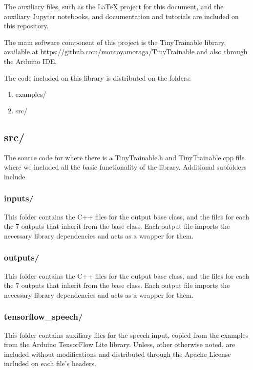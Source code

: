The auxiliary files, such as the LaTeX project for this document, and the auxiliary Jupyter notebooks, and documentation and tutorials are included on this repository.

The main software component of this project is the TinyTrainable library, available at https://github.com/montoyamoraga/TinyTrainable and also through the Arduino IDE.

The code included on this library is distributed on the folders:

\begin{enumerate}
  \item examples/
  \item src/
\end{enumerate}

\subsection{src/}

The source code for where there is a TinyTrainable.h and TinyTrainable.cpp file where we included all the basic functionality of the library. Additional subfolders include

\subsubsection{inputs/}

This folder contains the C++ files for the output base class, and the files for each the 7 outputs that inherit from the base class. Each output file imports the necessary library dependencies and acts as a wrapper for them.
\subsubsection{outputs/}

This folder contains the C++ files for the output base class, and the files for each the 7 outputs that inherit from the base class. Each output file imports the necessary library dependencies and acts as a wrapper for them.

\subsubsection{tensorflow{\_}speech/}

This folder contains auxiliary files for the speech input, copied from the examples from the Arduino TensorFlow Lite library. Unless, other otherwise noted, are included without modifications and distributed through the Apache License included on each file's headers.

